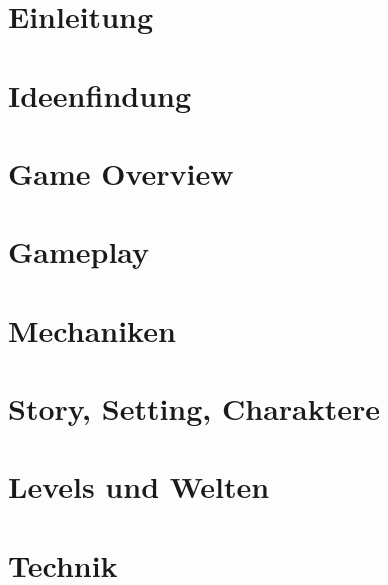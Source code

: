 





%

\tableofcontents


\clearpage
\section{Einleitung}


\clearpage
\section{Ideenfindung}


\clearpage
\section{Game Overview}







\clearpage
\section{Gameplay}




\clearpage
\section{Mechaniken}





\clearpage
\section{Story, Setting, Charaktere}





\clearpage
\section{Levels und Welten}







\clearpage
\section{Technik}



